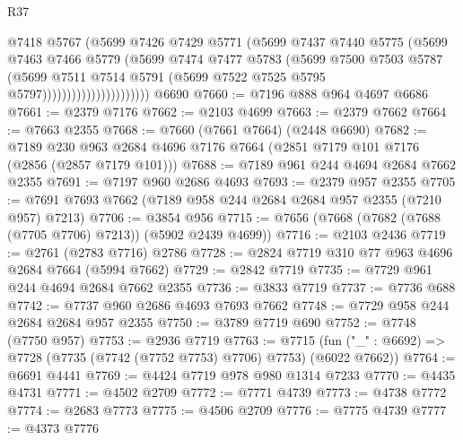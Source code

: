 \begin{lexlean}{R37}
\begin{coremodule}
                                  @7418
                                  @5767
                                  (@5699
                                    @7426
                                    @7429
                                    @5771
                                    (@5699
                                      @7437
                                      @7440
                                      @5775
                                      (@5699
                                        @7463
                                        @7466
                                        @5779
                                        (@5699
                                          @7474
                                          @7477
                                          @5783
                                          (@5699
                                            @7500
                                            @7503
                                            @5787
                                            (@5699
                                              @7511
                                              @7514
                                              @5791
                                              (@5699 @7522 @7525 @5795 @5797))))))))))))))))))))))
    @6690
@7660 := @7196 @888 @964 @4697 @6686
@7661 := @2379 @7176
@7662 := @2103 @4699
@7663 := @2379 @7662
@7664 := @7663 @2355
@7668 := @7660 (@7661 @7664) (@2448 @6690)
@7682 := @7189 @230 @963 @2684 @4696 @7176 @7664 (@2851 @7179 @101 @7176 (@2856 (@2857 @7179 @101)))
@7688 := @7189 @961 @244 @4694 @2684 @7662 @2355
@7691 := @7197 @960 @2686 @4693
@7693 := @2379 @957 @2355
@7705 := @7691 @7693 @7662 (@7189 @958 @244 @2684 @2684 @957 @2355 (@7210 @957) @7213)
@7706 := @3854 @956
@7715 := @7656 (@7668 (@7682 (@7688 (@7705 @7706) @7213)) (@5902 @2439 @4699))
@7716 := @2103 @2436
@7719 := @2761 (@2783 @7716) @2786
@7728 := @2824 @7719 @310 @77 @963 @4696 @2684 @7664 (@5994 @7662)
@7729 := @2842 @7719
@7735 := @7729 @961 @244 @4694 @2684 @7662 @2355
@7736 := @3833 @7719
@7737 := @7736 @688
@7742 := @7737 @960 @2686 @4693 @7693 @7662
@7748 := @7729 @958 @244 @2684 @2684 @957 @2355
@7750 := @3789 @7719 @690
@7752 := @7748 (@7750 @957)
@7753 := @2936 @7719
@7763 := @7715 (fun ("_" : @6692) => @7728 (@7735 (@7742 (@7752 @7753) @7706) @7753) (@6022 @7662))
@7764 := @6691 @4441
@7769 := @4424 @7719 @978 @980 @1314 @7233
@7770 := @4435 @4731
@7771 := @4502 @2709
@7772 := @7771 @4739
@7773 := @4738 @7772
@7774 := @2683 @7773
@7775 := @4506 @2709
@7776 := @7775 @4739
@7777 := @4373 @7776

\end{coremodule}
\end{lexlean}
